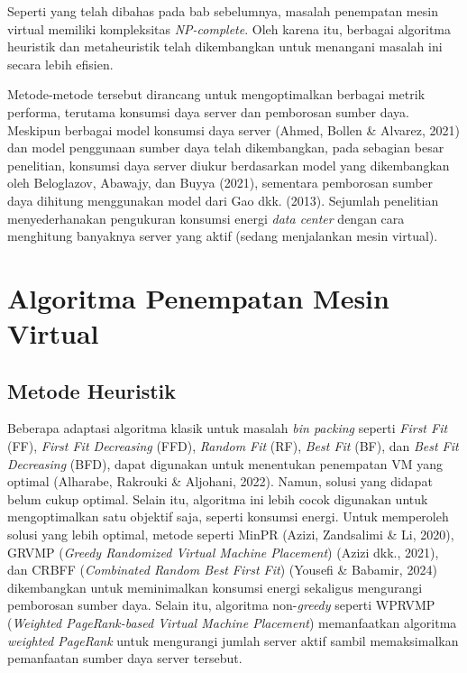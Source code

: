 Seperti yang telah dibahas pada bab sebelumnya, masalah penempatan mesin virtual memiliki kompleksitas \textit{NP-complete}. Oleh karena itu, berbagai algoritma heuristik dan metaheuristik telah dikembangkan untuk menangani masalah ini secara lebih efisien.

Metode-metode tersebut dirancang untuk mengoptimalkan berbagai metrik performa, terutama konsumsi daya server dan pemborosan sumber daya. Meskipun berbagai model konsumsi daya server (Ahmed, Bollen \& Alvarez, 2021) dan model penggunaan sumber daya telah dikembangkan, pada sebagian besar penelitian, konsumsi daya server diukur berdasarkan model yang dikembangkan oleh Beloglazov, Abawajy, dan Buyya (2021), sementara pemborosan sumber daya dihitung menggunakan model dari Gao dkk. (2013). Sejumlah penelitian menyederhanakan pengukuran konsumsi energi \textit{data center} dengan cara menghitung banyaknya server yang aktif (sedang menjalankan mesin virtual).  

\section{Algoritma Penempatan Mesin Virtual}
\subsection{Metode Heuristik}
Beberapa adaptasi algoritma klasik untuk masalah \textit{bin packing} seperti \textit{First Fit} (FF), \textit{First Fit Decreasing} (FFD), \textit{Random Fit} (RF), \textit{Best Fit} (BF), dan \textit{Best Fit Decreasing} (BFD), dapat digunakan untuk menentukan penempatan VM yang optimal (Alharabe, Rakrouki \& Aljohani, 2022). Namun, solusi yang didapat belum cukup optimal. Selain itu, algoritma ini lebih cocok digunakan untuk mengoptimalkan satu objektif saja, seperti konsumsi energi. Untuk memperoleh solusi yang lebih optimal, metode seperti MinPR (Azizi, Zandsalimi \& Li, 2020), GRVMP (\textit{Greedy Randomized Virtual Machine Placement}) (Azizi dkk., 2021), dan CRBFF (\textit{Combinated Random Best First Fit}) (Yousefi \& Babamir, 2024) dikembangkan untuk meminimalkan konsumsi energi sekaligus mengurangi pemborosan sumber daya. Selain itu, algoritma non-\textit{greedy} seperti WPRVMP (\textit{Weighted PageRank-based Virtual Machine Placement}) memanfaatkan algoritma \textit{weighted PageRank} untuk mengurangi jumlah server aktif sambil memaksimalkan pemanfaatan sumber daya server tersebut.

